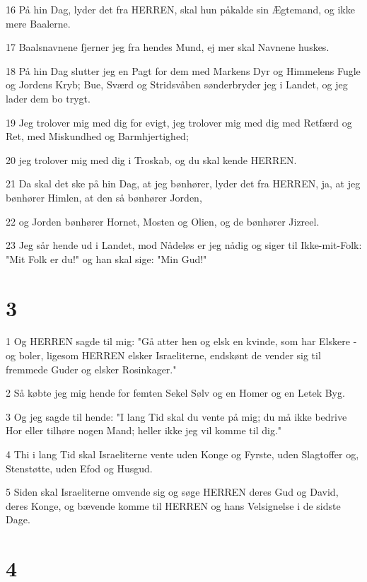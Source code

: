 \par 16 På hin Dag, lyder det fra HERREN, skal hun påkalde sin Ægtemand, og ikke mere Baalerne.
\par 17 Baalsnavnene fjerner jeg fra hendes Mund, ej mer skal Navnene huskes.
\par 18 På hin Dag slutter jeg en Pagt for dem med Markens Dyr og Himmelens Fugle og Jordens Kryb; Bue, Sværd og Stridsvåben sønderbryder jeg i Landet, og jeg lader dem bo trygt.
\par 19 Jeg trolover mig med dig for evigt, jeg trolover mig med dig med Retfærd og Ret, med Miskundhed og Barmhjertighed;
\par 20 jeg trolover mig med dig i Troskab, og du skal kende HERREN.
\par 21 Da skal det ske på hin Dag, at jeg bønhører, lyder det fra HERREN, ja, at jeg bønhører Himlen, at den så bønhører Jorden,
\par 22 og Jorden bønhører Hornet, Mosten og Olien, og de bønhører Jizreel.
\par 23 Jeg sår hende ud i Landet, mod Nådeløs er jeg nådig og siger til Ikke-mit-Folk: "Mit Folk er du!" og han skal sige: "Min Gud!"

\chapter{3}

\par 1 Og HERREN sagde til mig: "Gå atter hen og elsk en kvinde, som har Elskere - og boler, ligesom HERREN elsker Israeliterne, endskønt de vender sig til fremmede Guder og elsker Rosinkager."
\par 2 Så købte jeg mig hende for femten Sekel Sølv og en Homer og en Letek Byg.
\par 3 Og jeg sagde til hende: "I lang Tid skal du vente på mig; du må ikke bedrive Hor eller tilhøre nogen Mand; heller ikke jeg vil komme til dig."
\par 4 Thi i lang Tid skal Israeliterne vente uden Konge og Fyrste, uden Slagtoffer og, Stenstøtte, uden Efod og Husgud.
\par 5 Siden skal Israeliterne omvende sig og søge HERREN deres Gud og David, deres Konge, og bævende komme til HERREN og hans Velsignelse i de sidste Dage.

\chapter{4}


